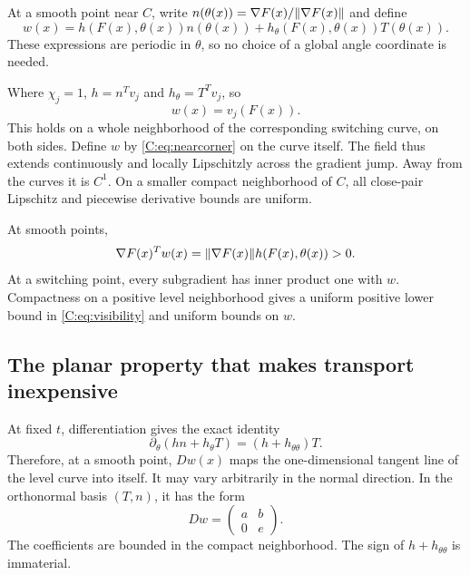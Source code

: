 At a smooth point near $C$, write $n(\theta(x))=\nabla F(x)/\lVert \nabla F(x)\rVert$ and define
\begin{equation}\label{C:eq:w}
 w(x)=h(F(x),\theta(x))n(\theta(x))
       +h_\theta(F(x),\theta(x))T(\theta(x)).
\end{equation}
These expressions are periodic in $\theta$, so no choice of a global angle coordinate is needed.

Where $\chi_j=1$, $h=n^Tv_j$ and $h_\theta=T^Tv_j$, so
\begin{equation}\label{C:eq:nearcorner}
 w(x)=v_j(F(x)).
\end{equation}
This holds on a whole neighborhood of the corresponding switching curve, on both sides. Define $w$ by \eqref{C:eq:nearcorner} on the curve itself. The field thus extends continuously and locally Lipschitzly across the gradient jump. Away from the curves it is $C^1$. On a smaller compact neighborhood of $C$, all close-pair Lipschitz and piecewise derivative bounds are uniform.

At smooth points,
\begin{equation}\label{C:eq:visibility}
 \nabla F(x)^Tw(x)=\lVert \nabla F(x)\rVert h(F(x),\theta(x))>0.
\end{equation}
At a switching point, every subgradient has inner product one with $w$. Compactness on a positive level neighborhood gives a uniform positive lower bound in \eqref{C:eq:visibility} and uniform bounds on $w$.

\subsection{The planar property that makes transport inexpensive}
At fixed $t$, differentiation gives the exact identity
\begin{equation}\label{C:eq:angleidentity}
 \partial_\theta(hn+h_\theta T)=(h+h_{\theta\theta})T.
\end{equation}
Therefore, at a smooth point, $Dw(x)$ maps the one-dimensional tangent line of the level curve into itself. It may vary arbitrarily in the normal direction. In the orthonormal basis $(T,n)$, it has the form
\begin{equation}\label{C:eq:triangular}
 Dw=\begin{pmatrix} a&b\\0&e\end{pmatrix}.
\end{equation}
The coefficients are bounded in the compact neighborhood. The sign of $h+h_{\theta\theta}$ is immaterial.


